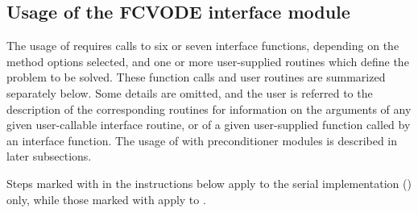 \subsection{Usage of the FCVODE interface module}\label{ss:fcvode_usage}

The usage of {\fcvode} requires calls to six or seven interface
functions, depending on the method options selected, and one or more
user-supplied routines which define the problem to be solved.  These
function calls and user routines are summarized separately below.
Some details are omitted, and the user is referred to the description
of the corresponding {\cvode} routines for information on the arguments 
of any given user-callable interface routine, or of a given user-supplied 
function called by an interface function.
The usage of {\fcvode} with preconditioner modules is described in later
subsections.

Steps marked with {\s} in the instructions below apply to the serial
{\nvector} implementation ({\nvecs}) only, while those marked with {\p}
apply to {\nvecp}.

